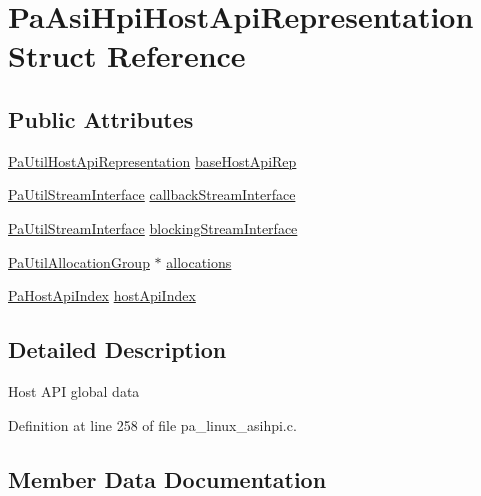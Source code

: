 \hypertarget{struct_pa_asi_hpi_host_api_representation}{}\section{Pa\+Asi\+Hpi\+Host\+Api\+Representation Struct Reference}
\label{struct_pa_asi_hpi_host_api_representation}
\subsection*{Public Attributes}
\begin{DoxyCompactItemize}
\item 
\hyperlink{struct_pa_util_host_api_representation}{Pa\+Util\+Host\+Api\+Representation} \hyperlink{struct_pa_asi_hpi_host_api_representation_a17c8f54b933c0d8c50007e1a40bd5acf}{base\+Host\+Api\+Rep}
\item 
\hyperlink{struct_pa_util_stream_interface}{Pa\+Util\+Stream\+Interface} \hyperlink{struct_pa_asi_hpi_host_api_representation_ad1d68d17d9ab37be6a3ec0c48749f0f4}{callback\+Stream\+Interface}
\item 
\hyperlink{struct_pa_util_stream_interface}{Pa\+Util\+Stream\+Interface} \hyperlink{struct_pa_asi_hpi_host_api_representation_a42f33f2e149240f040e17cdc8ec98104}{blocking\+Stream\+Interface}
\item 
\hyperlink{struct_pa_util_allocation_group}{Pa\+Util\+Allocation\+Group} $\ast$ \hyperlink{struct_pa_asi_hpi_host_api_representation_a5ee6781a5d05f97533f06a92cef72dc6}{allocations}
\item 
\hyperlink{portaudio_8h_aeef6da084c57c70aa94be97411e19930}{Pa\+Host\+Api\+Index} \hyperlink{struct_pa_asi_hpi_host_api_representation_abad64b525a3e7fb58f73414dba93340a}{host\+Api\+Index}
\end{DoxyCompactItemize}


\subsection{Detailed Description}
Host A\+PI global data 

Definition at line 258 of file pa\+\_\+linux\+\_\+asihpi.\+c.



\subsection{Member Data Documentation}
